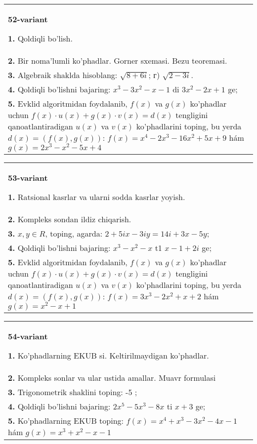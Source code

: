 \documentclass{article}
\begin{document}
\begin{tabular}{m{17cm}}
\textbf{52-variant}
\newline

\textbf{1.} Qoldiqli bo’lish.  \\
\textbf{2.} Bir noma’lumli ko’phadlar. Gorner sxemasi. Bezu teoremasi.  \\
\textbf{3.} Algebraik shaklda hisoblang: $\sqrt{8+6 i}$; г) $\sqrt{2-3 i}$. \\
\textbf{4.} Qoldiqli bo’lishni bajaring: $x^3-3 x^2-x-1$ di $3 x^2-2 x+1$ ge; \\
\textbf{5.} Evklid algoritmidan foydalanib, $f(x)$ va $g(x)$ ko’phadlar uchun $f(x) \cdot u(x)+g(x) \cdot v(x)=d(x)$ tengligini qanoatlantiradigan $u(x)$ va $v(x)$ ko’phadlarini toping, bu yerda $d(x)=(f(x), g(x))$:  $f(x)=x^4-2 x^3-16 x^2+5 x+9$ hám $g(x)=2 x^3-x^2-5 x+4$ \\

\end{tabular}
\vspace{1cm}


\begin{tabular}{m{17cm}}
\textbf{53-variant}
\newline

\textbf{1.} Ratsional kasrlar va ularni sodda kasrlar yoyish. \\
\textbf{2.} Kompleks sondan ildiz chiqarish. \\
\textbf{3.}  $x, y \in R$, toping, agarda: $2+5 i x-3 i y=14 i+3 x-5 y$; \\
\textbf{4.} Qoldiqli bo’lishni bajaring:  $x^3-x^2-x$ t1 $x-1+2 i$ ge; \\
\textbf{5.} Evklid algoritmidan foydalanib, $f(x)$ va $g(x)$ ko’phadlar uchun $f(x) \cdot u(x)+g(x) \cdot v(x)=d(x)$ tengligini qanoatlantiradigan $u(x)$ va $v(x)$ ko’phadlarini toping, bu yerda $d(x)=(f(x), g(x))$:  $f(x)=3 x^3-2 x^2+x+2$ hám $g(x)=x^2-x+1$ \\

\end{tabular}
\vspace{1cm}


\begin{tabular}{m{17cm}}
\textbf{54-variant}
\newline

\textbf{1.} Ko’phadlarning EKUB si. Keltirilmaydigan ko’phadlar. \\
\textbf{2.} Kompleks sonlar va ular ustida amallar. Muavr formulasi  \\
\textbf{3.} Trigonometrik shaklini toping: -5 ;  \\
\textbf{4.} Qoldiqli bo’lishni bajaring: $2 x^5-5 x^3-8 x$ ti $x+3$ ge; \\
\textbf{5.} Ko’phadlarning EKUB toping:  $f(x)=x^4+x^3-3 x^2-4 x-1$ hám $g(x)=x^3+x^2-x-1$ \\

\end{tabular}
\vspace{1cm}
\end{document}
